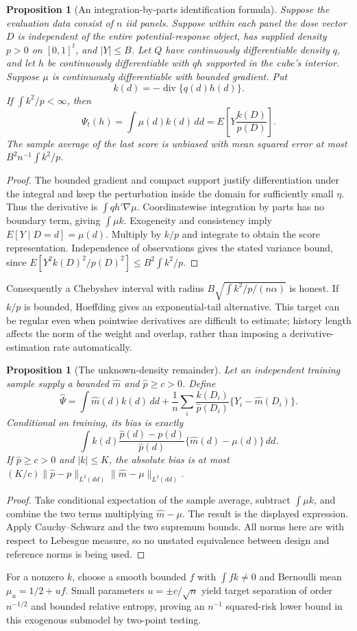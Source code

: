 \documentclass[11pt]{article}
\newtheorem{proposition}[theorem]{Proposition}
\theoremstyle{remark}
\begin{document}
\begin{proposition}[An integration-by-parts identification formula]
Suppose the evaluation data consist of $n$ iid panels. Suppose within each panel the dose vector $D$ is independent of the entire potential-response object, has supplied density $p>0$ on $[0,1]^t$, and $|Y|\le B$. Let $Q$ have continuously differentiable density $q$, and let $h$ be continuously differentiable with $qh$ supported in the cube's interior. Suppose $\mu$ is continuously differentiable with bounded gradient. Put
\[
 k(d)=-\operatorname{div}\{q(d)h(d)\}.
\]
If $\int k^2/p<\infty$, then
\[
 \Psi_t(h)=\int\mu(d)k(d)\,dd
 =E\left[Y\frac{k(D)}{p(D)}\right].
\]
The sample average of the last score is unbiased with mean squared error at most $B^2n^{-1}\int k^2/p$.
\end{proposition}
\begin{proof}
The bounded gradient and compact support justify differentiation under the integral and keep the perturbation inside the domain for sufficiently small $\eta$. Thus the derivative is $\int qh'\nabla\mu$. Coordinatewise integration by parts has no boundary term, giving $\int\mu k$. Exogeneity and consistency imply $E[Y\mid D=d]=\mu(d)$. Multiply by $k/p$ and integrate to obtain the score representation. Independence of observations gives the stated variance bound, since $E[Y^2k(D)^2/p(D)^2]\le B^2\int k^2/p$.
\end{proof}
Consequently a Chebyshev interval with radius $B\sqrt{\int k^2/p/(n\alpha)}$ is honest. If $k/p$ is bounded, Hoeffding gives an exponential-tail alternative. This target can be regular even when pointwise derivatives are difficult to estimate; history length affects the norm of the weight and overlap, rather than imposing a derivative-estimation rate automatically.

\begin{proposition}[The unknown-density remainder]
Let an independent training sample supply a bounded $\widehat m$ and $\widehat p\ge c>0$. Define
\[
 \widehat\Psi=\int\widehat m(d)k(d)\,dd+
 \frac1n\sum_i\frac{k(D_i)}{\widehat p(D_i)}\{Y_i-\widehat m(D_i)\}.
\]
Conditional on training, its bias is exactly
\[
 \int k(d)\frac{\widehat p(d)-p(d)}{\widehat p(d)}
                 \{\widehat m(d)-\mu(d)\}\,dd.
\]
If $\widehat p\ge c>0$ and $|k|\le K$, the absolute bias is at most
$(K/c)\|\widehat p-p\|_{L^2(dd)}\|\widehat m-\mu\|_{L^2(dd)}$.
\end{proposition}
\begin{proof}
Take conditional expectation of the sample average, subtract $\int\mu k$, and combine the two terms multiplying $\widehat m-\mu$. The result is the displayed expression. Apply Cauchy--Schwarz and the two supremum bounds. All norms here are with respect to Lebesgue measure, so no unstated equivalence between design and reference norms is being used.
\end{proof}
For a nonzero $k$, choose a smooth bounded $f$ with $\int fk\ne0$ and Bernoulli mean $\mu_u=1/2+uf$. Small parameters $u=\pm c/\sqrt n$ yield target separation of order $n^{-1/2}$ and bounded relative entropy, proving an $n^{-1}$ squared-risk lower bound in this exogenous submodel by two-point testing.
\end{document}
